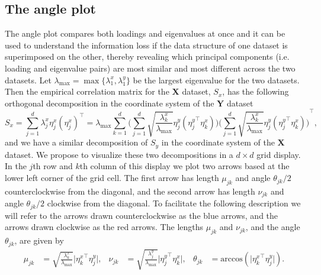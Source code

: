 \documentclass[a4paper,12pt]{article}
\newcommand{\acos}{\text{arccos}}
\begin{document}
\subsection*{The angle plot}
The angle plot compares both loadings and eigenvalues at once and it can be used to understand the information loss if the data structure of one dataset is superimposed on the other, thereby revealing which principal components (i.e. loading and eigenvalue pairs) are most similar and most different across the two datasets. Let $\lambda_{\max} = \max\{ \lambda_{1}^x, \lambda_{1}^y \}$ be the largest eigenvalue for the two datasets. Then the empirical correlation matrix for the $\mathbf{X}$ dataset, $S_x$, has the following orthogonal decomposition in the coordinate system of the $\mathbf{Y}$ dataset
\begin{equation*}
S_x = \sum_{j=1}^d \lambda_{j}^x \eta_{j}^x ({\eta_{j}^x})^\top
= \lambda_{\max} \sum_{k=1}^d
\Bigg( \sum_{j=1}^d \sqrt{\frac{\lambda_{k}^x}{\lambda_{\max}}} \eta_{j}^y ({\eta_{j}^y}^\top \eta_{k}^x) \Bigg)
{\Bigg( \sum_{j=1}^d \sqrt{\frac{\lambda_{k}^x}{\lambda_{\max}}} \eta_{j}^y ({\eta_{j}^y}^\top \eta_{k}^x) \Bigg)}^\top,
\end{equation*}
and we have a similar decomposition of $S_y$ in the coordinate system of the $\mathbf{X}$ dataset. We propose to visualize these two decompositions in a $d \times d$ grid display. In the $j$th row and $k$th column of this display we plot two arrows based at the lower left corner of the grid cell. The first arrow has length $\mu_{jk}$ and angle $\theta_{jk}/2$ counterclockwise from the diagonal, and the second arrow has length $\nu_{jk}$ and angle $\theta_{jk}/2$ clockwise from the diagonal. To facilitate the following description we will refer to the arrows drawn counterclockwise as the blue arrows, and the arrows drawn clockwise as the red arrows. The lengths $\mu_{jk}$ and $\nu_{jk}$, and the angle $\theta_{jk}$, are given by
\begin{align*}
\mu_{jk} &= \sqrt{\frac{\lambda_{k}^x}{\lambda_{\max}}} \lvert {\eta_{k}^x}^\top \eta_{j}^y \rvert, &
\nu_{jk} &= \sqrt{\frac{\lambda_{j}^y}{\lambda_{\max}}} \lvert {\eta_{j}^y}^\top \eta_{k}^x \rvert, &
\theta_{jk} &= \acos(\lvert {\eta_{k}^x}^\top \eta_{j}^y \rvert).
\end{align*}
\end{document}
